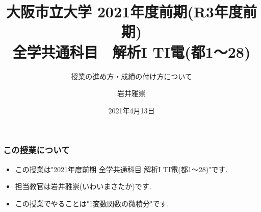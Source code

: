\documentclass[11pt,dvipdfmx]{beamer}
\title[2021年度前期 全学共通科目 解析I TI電(都1〜28)]{大阪市立大学 2021年度前期(R3年度前期) \\ 全学共通科目　解析I TI電(都1〜28)}
\subtitle{授業の進め方・成績の付け方について}
\author[岩井雅崇]{岩井雅崇}
\institute[大阪市立大学数学研究所]{大阪市立大学数学研究所}
\date{2021年4月13日}  %
\theoremstyle{definition}
\theoremstyle{remark}
\begin{document}

\begin{frame}  %
 \titlepage    %
\end{frame}





\section{ }
\begin{frame}
\frametitle{この授業について}
 \begin{itemize}


 \item この授業は"2021年度前期 全学共通科目 解析I TI電(都1〜28)"です.
 \item 担当教官は岩井雅崇(いわいまさたか)です.
 \item この授業でやることは"1変数関数の微積分"です.
 
 \end{itemize}
\end{frame}
\end{document}
